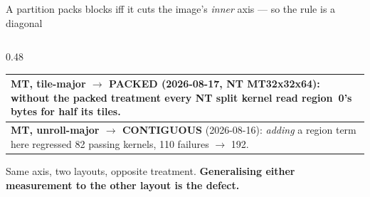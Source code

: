 \documentclass[aspectratio=169,9pt]{beamer}
\newcommand{\bad}[1]{\textcolor{warn}{\textbf{#1}}}
\newcommand{\good}[1]{\textcolor{ok}{\textbf{#1}}}
\begin{document}
\begin{frame}[fragile]{A partition packs blocks iff it cuts the image's \emph{inner} axis --- so the rule is a diagonal}
\begin{columns}[T]
\begin{column}{0.48\textwidth}
\smallskip
\begin{tabular}{@{}p{}@{}}
\toprule
\bad{MT, tile-major $\rightarrow$ PACKED} (2026-08-17, NT MT32x32x64): without the packed
treatment every NT split kernel read region~0's bytes for half its tiles. \\
\midrule
\good{MT, unroll-major $\rightarrow$ CONTIGUOUS} (2026-08-16): \emph{adding} a region term here
regressed 82 passing kernels, 110 failures $\rightarrow$ 192. \\
\bottomrule
\end{tabular}

\smallskip
Same axis, two layouts, opposite treatment. \bad{Generalising either measurement to the other
layout is the defect.}
\end{column}
\end{columns}
\end{frame}
\end{document}
